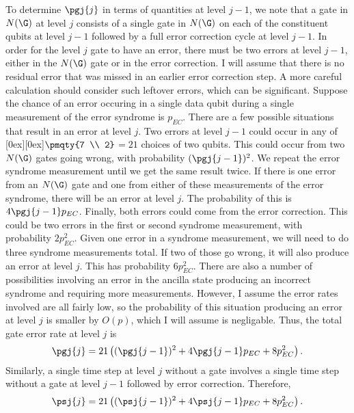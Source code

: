 To determine $\pgj{j}$ in terms of quantities at level $j-1$, we note
that a gate in $N(\G)$ at level $j$ consists of a single gate in $N(\G)$ on
each of the constituent qubits at level $j-1$ followed by a full error
correction cycle at level $j-1$.   In order for the level $j$ gate to have an
error, there must be two errors at level $j-1$, either in the $N(\G)$ gate or
in the error correction.  I will assume that there is no residual error
that was missed in an earlier error correction step.  A more careful
calculation should consider such leftover errors, which can be significant.
Suppose the chance of an error occuring in a single
data qubit during a single measurement of the error syndrome is $p_{EC}$.
There are a few possible situations that result in an error at level $j$.  Two
errors at level $j-1$ could occur in any of
\raisebox{0ex}[0ex][0ex]{\mbox{\tiny $\pmqty{7 \\ 2}$}$ = 21$}
choices of two qubits.  This could occur from two $N(\G)$ gates going
wrong, with probability $(\pgj{j-1})^2$.  We repeat the error syndrome
measurement until we get the same result twice.  If there is one error from an
$N(\G)$ gate and one from either of these measurements of the error syndrome,
there will be an error at level $j$.  The probability of this is $4 \pgj{j-1}
p_{EC}$.  Finally, both errors could come from the error correction.  This
could be two errors in the first or second syndrome measurement, with
probability $2 p_{EC}^2$.  Given one error in a syndrome measurement, we
will need to do three syndrome measurements total.  If two of those go
wrong, it will also produce an error at level $j$.  This has probability $6
p_{EC}^2$.  There are also a number of possibilities involving an error in the
ancilla state producing an incorrect syndrome and requiring more
measurements.  However, I assume the error rates involved are all fairly
low, so the probability of this situation producing an error at level $j$ is
smaller by $O(p)$, which I will assume is negligable.  Thus, the total gate
error rate at level $j$ is
\begin{equation}
	\pgj{j} = 21 \left((\pgj{j-1})^2 + 4 \pgj{j-1} p_{EC} + 8 p_{EC}^2 \right).
	\label{eq-pg-recursion}
\end{equation}
Similarly, a single time step at level $j$ without a gate involves a single
time step without a gate at level $j-1$ followed by error correction.
Therefore,
\begin{equation}
	\psj{j} = 21 \left((\psj{j-1})^2 + 4 \psj{j-1} p_{EC} + 8 p_{EC}^2 \right).
	\label{eq-ps-recursion}
\end{equation}

